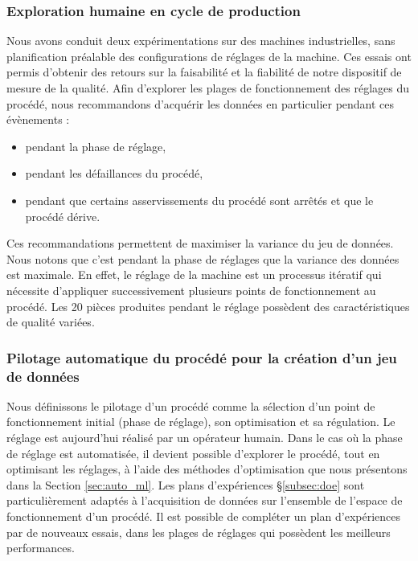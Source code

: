 \subsubsection{Exploration humaine en cycle de production}
Nous avons conduit deux expérimentations sur des machines industrielles, sans planification préalable des configurations de réglages de la machine.
Ces essais ont permis d'obtenir des retours sur la faisabilité et la fiabilité de notre dispositif de mesure de la qualité.
Afin d'explorer les plages de fonctionnement des réglages du procédé, nous recommandons d'acquérir les données en particulier pendant ces évènements :
\begin{itemize}
	\item pendant la phase de réglage,
	\item pendant les défaillances du procédé,
	\item pendant que certains asservissements du procédé sont arrêtés et que le procédé dérive.
\end{itemize}
Ces recommandations permettent de maximiser la variance du jeu de données.
Nous notons que c'est pendant la phase de réglages que la variance des données est maximale.
En effet, le réglage de la machine est un processus itératif qui nécessite d'appliquer successivement plusieurs points de fonctionnement au procédé.
Les 20 pièces produites pendant le réglage possèdent des caractéristiques de qualité variées.

\subsubsection{Pilotage automatique du procédé pour la création d'un jeu de données}
Nous définissons le pilotage d'un procédé comme la sélection d'un point de fonctionnement initial (phase de réglage), son optimisation et sa régulation.
Le réglage est aujourd'hui réalisé par un opérateur humain.
Dans le cas où la phase de réglage est automatisée, il devient possible d'explorer le procédé, tout en optimisant les réglages, à l'aide des méthodes d'optimisation que nous présentons dans la Section \ref{sec:auto_ml}.
Les plans d'expériences §\ref{subsec:doe} sont particulièrement adaptés à l'acquisition de données sur l'ensemble de l'espace de fonctionnement d'un procédé.
Il est possible de compléter un plan d'expériences par de nouveaux essais, dans les plages de réglages qui possèdent les meilleurs performances.


\bigskip

\bigskip

